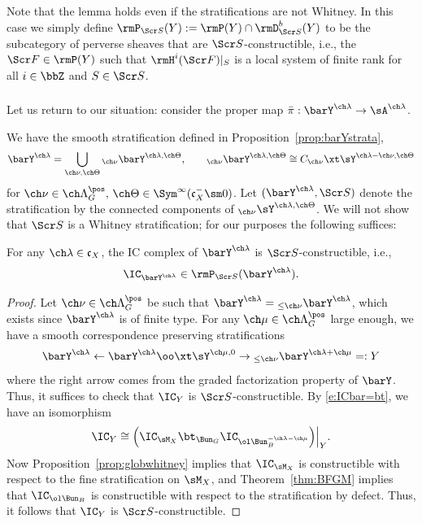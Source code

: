 Note that the lemma holds even if the stratifications are not Whitney.
In this case we simply define $\rmP_{\Scr S}(Y) := \rmP(Y) \cap \rmD^b_{\Scr S}(Y)$
to be the subcategory of perverse sheaves that are $\Scr S$-constructible, i.e.,
the $\Scr F \in \rmP(Y)$ such that $\rmH^i(\Scr F)|_S$ is a local system
of finite rank for all $i\in \bbZ$ and $S\in \Scr S$.

\subsubsection{}
Let us return to our situation: consider the proper map
$\bar\pi : \barY^{\ch\lambda} \to \sA^{\ch\lambda}$.

We have the smooth stratification defined in Proposition~\ref{prop:barYstrata},
\[ \barY^{\ch\lambda} = \bigcup_{\ch\nu,\ch\Theta}
{}_{\ch\nu}\barY^{\ch\lambda,\ch\Theta}, \qquad
{_{\ch\nu}}\barY^{\ch\lambda,\ch\Theta} \cong
C_{\ch\nu} \xt \sY^{\ch\lambda-\ch\nu,\ch\Theta} \]
for $\ch\nu \in \ch\Lambda^\pos_G,\,
\ch\Theta \in \Sym^\infty(\mathfrak c_X^-\sm 0)$.
Let $(\barY^{\ch\lambda},\Scr S)$ denote the stratification by
 the connected components of
$_{\ch\nu}\sY^{\ch\lambda, \ch\Theta}$.
We will not show that $\Scr S$ is a Whitney stratification; for our purposes
the following suffices:

\begin{lem}
\notready \label{lem:barICwhitney}
For any $\ch\lambda \in \mathfrak c_X$,
the IC complex of $\barY^{\ch\lambda}$ is $\Scr S$-constructible,
i.e.,
\[ \IC_{\barY^{\ch\lambda}} \in \rmP_{\Scr S}(\barY^{\ch\lambda}). \]
\end{lem}
\begin{proof}
Let $\ch\nu \in \ch\Lambda^\pos_G$ be such that
$\barY^{\ch\lambda} = {_{\le\ch\nu}}\barY^{\ch\lambda}$, which exists
since $\barY^{\ch\lambda}$ is of finite type.
For any $\ch\mu \in \ch\Lambda^\pos_G$ large enough, we have
a smooth correspondence preserving stratifications
\[ \barY^{\ch\lambda} \leftarrow \barY^{\ch\lambda}\oo\xt \sY^{\ch\mu,0} \to
{_{\le\ch\nu}}\barY^{\ch\lambda+\ch\mu} =: Y\]
where the right arrow comes from the graded factorization property of $\barY$.
Thus, it suffices to check that
$\IC_Y$ is $\Scr S$-constructible.
By \eqref{e:ICbar=bt}, we have an isomorphism
\[ \IC_Y \cong \Bigl.\Bigl(\IC_{\sM_X} \bt_{\Bun_G} \IC_{\ol\Bun_B^{-\ch\lambda-\ch\mu}}\Bigr)\Bigr|_Y. \]
Now Proposition~\ref{prop:globwhitney} implies that
$\IC_{\sM_X}$ is constructible with respect to the fine stratification on
$\sM_X$, and Theorem~\ref{thm:BFGM} implies that $\IC_{\ol\Bun_B}$ is constructible
with respect to the stratification by defect.
Thus, it follows that $\IC_Y$ is $\Scr S$-constructible.
\end{proof}


